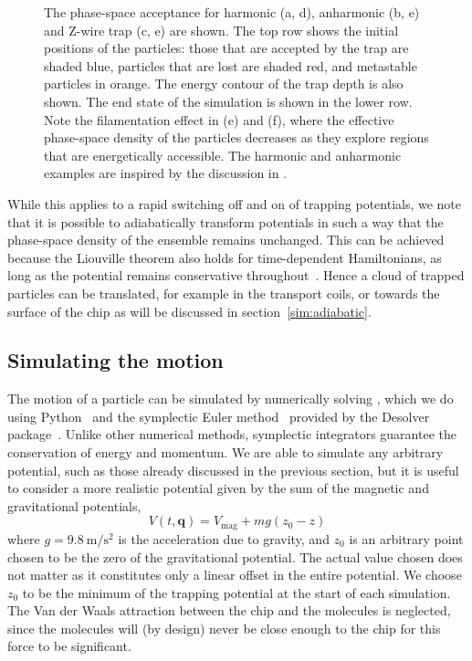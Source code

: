 \begin{figure}[htb]
  \centering
  \caption[Phase-space acceptance examples]{
    The phase-space acceptance for harmonic (a, d), anharmonic (b, e) and
    Z-wire trap (c, e) are shown. The top row shows the initial positions of
    the particles: those that are accepted by the trap are shaded blue,
    particles that are lost are shaded red, and metastable particles in orange.
    The energy contour of the trap depth is also shown. The end state of the
    simulation is shown in the lower row. Note the filamentation effect in (e)
    and (f), where the effective phase-space density of the particles decreases
    as they explore regions that are energetically accessible. The harmonic and
    anharmonic examples are inspired by the discussion in
    .
  }
  \label{sim:fig:psaeg}
\end{figure}

While this applies to a rapid switching off and on of trapping potentials, we
note that it is possible to adiabatically transform potentials in such a way
that the phase-space density of the ensemble remains unchanged. This can be
achieved because the Liouville theorem also holds for time-dependent
Hamiltonians, as long as the potential remains conservative
throughout~\cite{Hand1998, Lichtenberg1969}. Hence a cloud of trapped particles
can be translated, for example in the transport coils, or towards the surface
of the chip as will be discussed in section~\ref{sim:adiabatic}.

\subsection{Simulating the motion}
\label{sim:motion:simmethods}

The motion of a particle can be simulated by numerically solving
, which we do using Python~\cite{python} and the
symplectic Euler method~\cite{Hairer2015, doi:10.1119/1.2034523} provided by
the Desolver package~\cite{desolver}. Unlike other numerical methods,
symplectic integrators guarantee the conservation of energy and momentum.
We are able to simulate any arbitrary potential, such as those already
discussed in the previous section, but it is useful to consider a more
realistic potential given by the sum of the magnetic and gravitational
potentials,
%
\begin{equation}
  V(t, \mathbf{q}) = V_\text{mag} + mg(z_0-z)
\end{equation}
where $g=\SI{9.8}{\meter\per\second\squared}$ is the acceleration due to
gravity, and $z_0$ is an arbitrary point chosen to be the zero of the
gravitational potential. The actual value chosen does not matter as it
constitutes only a linear offset in the entire potential. We choose
$z_0$ to be the minimum of the trapping potential at the start of each
simulation.
%
The Van der Waals attraction between the chip and the molecules is neglected,
since the molecules will (by design) never be close enough to the chip for this
force to be significant.

